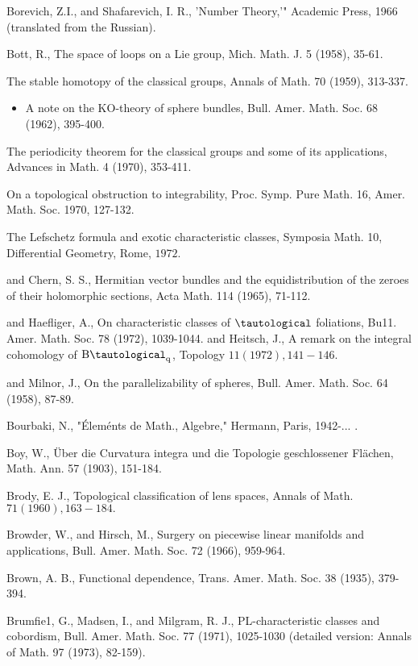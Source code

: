 \documentclass[10pt]{article}
\begin{document}
Borevich, Z.I., and Shafarevich, I. R., 'Number Theory,'" Academic Press, 1966 (translated from the Russian).

Bott, R., The space of loops on a Lie group, Mich. Math. J. 5 (1958), 35-61.

The stable homotopy of the classical groups, Annals of Math. 70 (1959), 313-337.

\begin{itemize}
  \item A note on the KO-theory of sphere bundles, Bull. Amer. Math. Soc. 68 (1962), 395-400.
\end{itemize}
The periodicity theorem for the classical groups and some of its applications, Advances in Math. 4 (1970), 353-411.

On a topological obstruction to integrability, Proc. Symp. Pure Math. 16, Amer. Math. Soc. 1970, 127-132.

The Lefschetz formula and exotic characteristic classes, Symposia Math. 10, Differential Geometry, Rome, $1972 .$

and Chern, S. S., Hermitian vector bundles and the equidistribution of the zeroes of their holomorphic sections, Acta Math. 114 (1965), 71-112.

and Haefliger, A., On characteristic classes of $\tautological$ foliations, Bu11. Amer. Math. Soc. 78 (1972), 1039-1044. and Heitsch, J., A remark on the integral cohomology of $\mathrm{B} \tautological_{\mathrm{q}}$, Topology $11(1972), 141-146 .$

and Milnor, J., On the parallelizability of spheres, Bull. Amer. Math. Soc. 64 (1958), 87-89.

Bourbaki, N., "Éleménts de Math., Algebre," Hermann, Paris, 1942-... .

Boy, W., Über die Curvatura integra und die Topologie geschlossener Flächen, Math. Ann. 57 (1903), 151-184.

Brody, E. J., Topological classification of lens spaces, Annals of Math. $71(1960), 163-184 .$

Browder, W., and Hirsch, M., Surgery on piecewise linear manifolds and applications, Bull. Amer. Math. Soc. 72 (1966), 959-964.

Brown, A. B., Functional dependence, Trans. Amer. Math. Soc. 38 (1935), 379-394.

Brumfie1, G., Madsen, I., and Milgram, R. J., PL-characteristic classes and cobordism, Bull. Amer. Math. Soc. 77 (1971), 1025-1030 (detailed version: Annals of Math. 97 (1973), 82-159).
\end{document}
